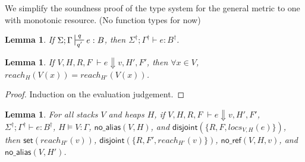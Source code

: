 \documentclass[11pt]{article}
\newcommand{\ms}[1]{\ensuremath{\mathsf{#1}}}
\newcommand{\na}[1]{\mathsf{no\_alias}(#1)}
\newcommand{\dist}[1]{\mathsf{disjoint}(#1)}
\newtheorem{lemma}[theorem]{Lemma}
\begin{document}
We simplify the soundness proof of the type system for the general metric to one with monotonic resource.
(No function types for now)

\begin{lemma}
\label{a} If $\Sigma; \Gamma \sststile{q'}{q} e : B$, then $\Sigma^{\dagger}; \Gamma^{\dagger} \vdash e : B^{\dagger}$.
\end{lemma}

\begin{lemma}
If $V,H,R,F \; \vdash e \Downarrow v, H', F'$, then $\forall x \in V$, $reach_H(V(x)) = reach_{H'}(V(x))$.
\end{lemma}
\begin{proof}
Induction on the evaluation judgement.
\end{proof}


\begin{lemma}
For all stacks $V$ and heaps $H$, if  $V,H,R,F \; \vdash e \Downarrow v, H', F'$, $\Sigma^{\dagger}; \Gamma^{\dagger} \vdash e : B^{\dagger}$, $H \vDash V : \Gamma$, $\na{V,H}$, and $\dist{\{R,F,locs_{V,H}(e)\}}$, then $\ms{set}(reach_{H'}(v))$, $\dist{\{R,F',reach_{H'}(v)\}}$, $\ms{no\_ref}(V,H,v)$, and $\na{V,H'}$.
\end{lemma}
\end{document}
